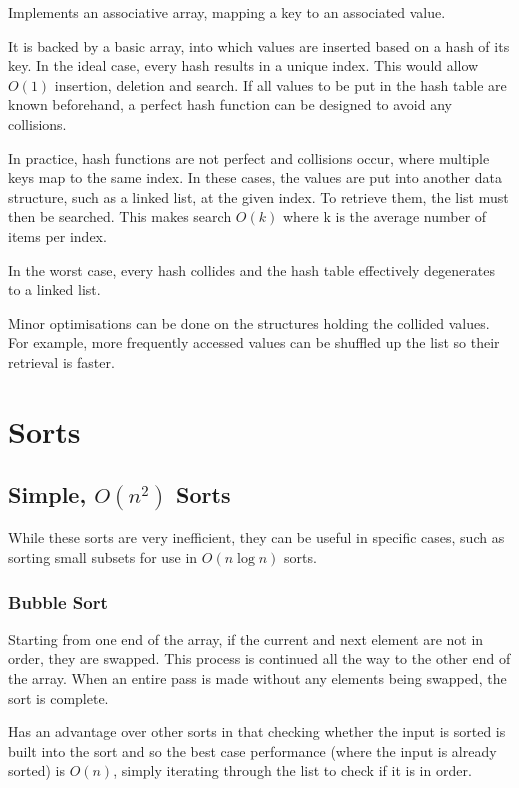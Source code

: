 \documentclass[]{article}
\begin{document}
Implements an associative array, mapping a key to an associated value.

It is backed by a basic array, into which values are inserted based on a hash of its key. In the ideal case, every hash results in a unique index. This would allow $O(1)$ insertion, deletion and search. If all values to be put in the hash table are known beforehand, a perfect hash function can be designed to avoid any collisions.

In practice, hash functions are not perfect and collisions occur, where multiple keys map to the same index. In these cases, the values are put into another data structure, such as a linked list, at the given index. To retrieve them, the list must then be searched. This makes search $O(k)$ where k is the average number of items per index.

In the worst case, every hash collides and the hash table effectively degenerates to a linked list.

Minor optimisations can be done on the structures holding the collided values. For example, more frequently accessed values can be shuffled up the list so their retrieval is faster.

\pagebreak

\section{Sorts}

\subsection{Simple, $O(n^2)$ Sorts}

While these sorts are very inefficient, they can be useful in specific cases, such as sorting small subsets for use in $O(n\log{n})$ sorts.

\subsubsection{Bubble Sort}

Starting from one end of the array, if the current and next element are not in order, they are swapped. This process is continued all the way to the other end of the array. When an entire pass is made without any elements being swapped, the sort is complete.

Has an advantage over other sorts in that checking whether the input is sorted is built into the sort and so the best case performance (where the input is already sorted) is $O(n)$, simply iterating through the list to check if it is in order.
\end{document}
